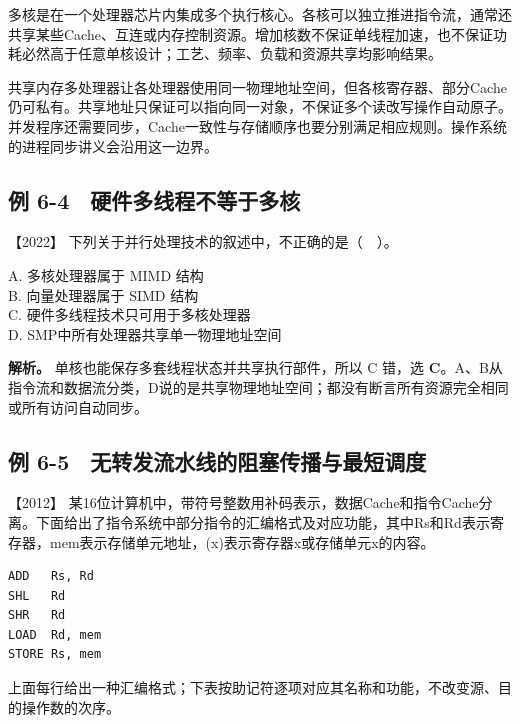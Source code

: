 多核是在一个处理器芯片内集成多个执行核心。各核可以独立推进指令流，通常还共享某些Cache、互连或内存控制资源。增加核数不保证单线程加速，也不保证功耗必然高于任意单核设计；工艺、频率、负载和资源共享均影响结果。

共享内存多处理器让各处理器使用同一物理地址空间，但各核寄存器、部分Cache仍可私有。共享地址只保证可以指向同一对象，不保证多个读改写操作自动原子。并发程序还需要同步，Cache一致性与存储顺序也要分别满足相应规则。操作系统的进程同步讲义会沿用这一边界。

\subsection{例 6-4　硬件多线程不等于多核}\label{co-ex6-4}

\noindent{}【2022】 下列关于并行处理技术的叙述中，不正确的是（　）。

A. 多核处理器属于 MIMD 结构\\
B. 向量处理器属于 SIMD 结构\\
C. 硬件多线程技术只可用于多核处理器\\
D. SMP中所有处理器共享单一物理地址空间


\textbf{解析。} 单核也能保存多套线程状态并共享执行部件，所以 C 错，选 \textbf{C}。A、B从指令流和数据流分类，D说的是共享物理地址空间；都没有断言所有资源完全相同或所有访问自动同步。

\subsection{例 6-5　无转发流水线的阻塞传播与最短调度}\label{co-ex6-5}

\noindent{}【2012】 某16位计算机中，带符号整数用补码表示，数据Cache和指令Cache分离。下面给出了指令系统中部分指令的汇编格式及对应功能，其中Rs和Rd表示寄存器，mem表示存储单元地址，(x)表示寄存器x或存储单元x的内容。

\par\medskip\noindent
\begin{minipage}{\linewidth}
\begin{verbatim}
ADD   Rs, Rd
SHL   Rd
SHR   Rd
LOAD  Rd, mem
STORE Rs, mem
\end{verbatim}
\end{minipage}\par\medskip

上面每行给出一种汇编格式；下表按助记符逐项对应其名称和功能，不改变源、目的操作数的次序。

